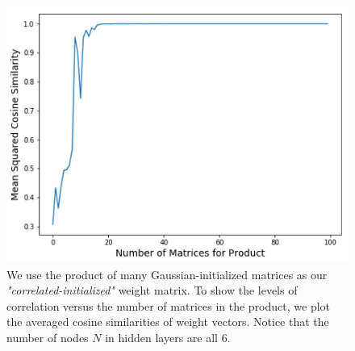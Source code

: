 \begin{figure}
    \begin{minipage}[c]{0.4\textwidth}
        \caption{We use the product of many Gaussian-initialized matrices as our \textit{"correlated-initialized"} weight matrix. To show the levels of correlation versus the number of matrices in the product, we plot the averaged cosine similarities of weight vectors. Notice that the number of nodes $N$ in hidden layers are all 6.}
        \label{fig:sec3_sim1}
    \end{minipage}\hfill
    \begin{minipage}[c]{0.5\textwidth}
        \includegraphics[width=\textwidth]{"CorrelatedInitialization"}
    \end{minipage}
\end{figure}